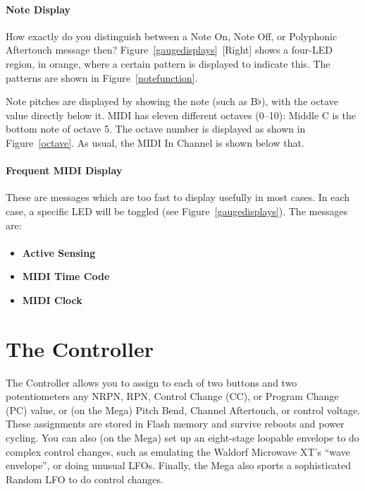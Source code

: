 \documentclass{article}
\begin{document}
\paragraph{Note Display}


How exactly do you distinguish between a Note On, Note Off, or Polyphonic Aftertouch message then?  Figure~{\ref{gaugedisplays}}~[Right] shows a four-LED region, in orange, where a certain pattern is displayed to indicate this.  The patterns are shown in Figure~\ref{notefunction}.

Note pitches are displayed by showing the note (such as B$\flat$), with the octave value directly below it.  MIDI has eleven different octaves (0--10): Middle C is the bottom note of octave 5.  The octave number is displayed as shown in Figure~\ref{octave}.  As usual, the MIDI In Channel is shown below that.


\paragraph{Frequent MIDI Display}  These are messages which are too fast to display usefully in most cases.  In each case, a specific LED will be toggled (see Figure~\ref{gaugedisplays}).  The messages are:

\paragraph{}\vspace{-2em}\begin{itemize}
\item {\bf Active Sensing}
\item {\bf MIDI Time Code}
\item {\bf MIDI Clock}
\end{itemize}


\clearpage
\section {The Controller}
\label{controller}

The Controller allows you to assign to each of two buttons and two potentiometers any NRPN, RPN, Control Change (CC), or Program Change (PC) value, or (on the Mega) Pitch Bend, Channel Aftertouch, or control voltage.  These assignments are stored in Flash memory and survive reboots and power cycling.  You can also (on the Mega) set up an eight-stage loopable envelope to do complex control changes, such as emulating the Waldorf Microwave XT's ``wave envelope'', or doing unusual LFOs.  Finally, the Mega also sports a sophisticated Random LFO to do control changes.
\end{document}
